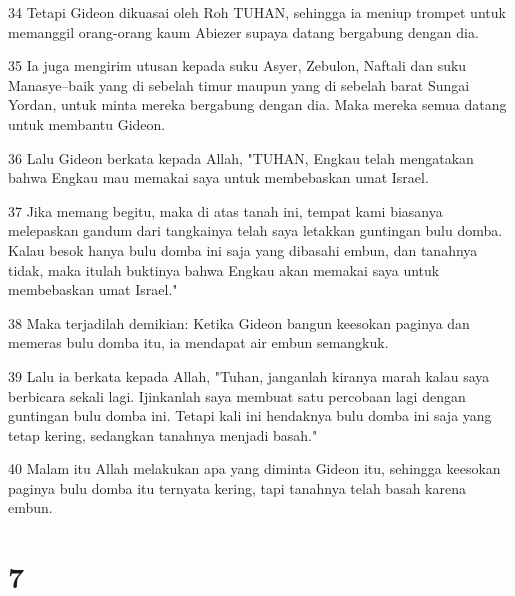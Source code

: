 \par 34 Tetapi Gideon dikuasai oleh Roh TUHAN, sehingga ia meniup trompet untuk memanggil orang-orang kaum Abiezer supaya datang bergabung dengan dia.
\par 35 Ia juga mengirim utusan kepada suku Asyer, Zebulon, Naftali dan suku Manasye--baik yang di sebelah timur maupun yang di sebelah barat Sungai Yordan, untuk minta mereka bergabung dengan dia. Maka mereka semua datang untuk membantu Gideon.
\par 36 Lalu Gideon berkata kepada Allah, "TUHAN, Engkau telah mengatakan bahwa Engkau mau memakai saya untuk membebaskan umat Israel.
\par 37 Jika memang begitu, maka di atas tanah ini, tempat kami biasanya melepaskan gandum dari tangkainya telah saya letakkan guntingan bulu domba. Kalau besok hanya bulu domba ini saja yang dibasahi embun, dan tanahnya tidak, maka itulah buktinya bahwa Engkau akan memakai saya untuk membebaskan umat Israel."
\par 38 Maka terjadilah demikian: Ketika Gideon bangun keesokan paginya dan memeras bulu domba itu, ia mendapat air embun semangkuk.
\par 39 Lalu ia berkata kepada Allah, "Tuhan, janganlah kiranya marah kalau saya berbicara sekali lagi. Ijinkanlah saya membuat satu percobaan lagi dengan guntingan bulu domba ini. Tetapi kali ini hendaknya bulu domba ini saja yang tetap kering, sedangkan tanahnya menjadi basah."
\par 40 Malam itu Allah melakukan apa yang diminta Gideon itu, sehingga keesokan paginya bulu domba itu ternyata kering, tapi tanahnya telah basah karena embun.

\chapter{7}

